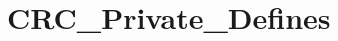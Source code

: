 \hypertarget{group___c_r_c___private___defines}{}\section{C\+R\+C\+\_\+\+Private\+\_\+\+Defines}
\label{group___c_r_c___private___defines}
